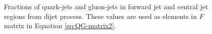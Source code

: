 \begin{figure}[htb]
	\centering
	\quad
	\caption[]{
		Fractions of quark-jets and gluon-jets  %
		in forward jet and central jet regions from {\pythia} dijet process. These values are used as elements in $F$ matrix in Equation \ref{eq:QG-matrix2}. %
		\label{fig:QG-Fmc}
	}
\end{figure}
%


